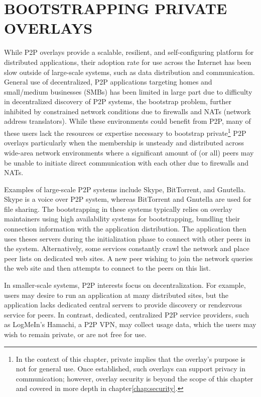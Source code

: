 \chapter{BOOTSTRAPPING PRIVATE OVERLAYS}
\label{chap:bootstrapping}

While P2P overlays provide a scalable, resilient, and self-configuring platform
for distributed applications, their adoption rate for use across the Internet
has been slow outside of large-scale systems, such as data distribution and
communication.  General use of decentralized, P2P applications targeting homes
and small/medium businesses (SMBs) has been limited in large part due to
difficulty in decentralized discovery of P2P systems, the bootstrap problem,
further inhibited by constrained network conditions due to firewalls and NATs
(network address translators).  While these environments could benefit from
P2P, many of these users lack the resources or expertise necessary to bootstrap
private\footnote{In the context of this chapter, private implies that the
overlay's purpose is not for general use. Once established, such overlays can
support privacy in communication; however, overlay security is beyond the scope
of this chapter and covered in more depth in chapter\ref{chap:security}.} P2P
overlays particularly when the membership is unsteady and distributed across
wide-area network environments where a significant amount of (or all) peers may
be unable to initiate direct communication with each other due to firewalls and
NATs.

Examples of large-scale P2P systems include Skype, BitTorrent, and Gnutella.
Skype is a voice over P2P system, whereas BitTorrent and Gnutella are used for
file sharing.  The bootstrapping in these systems typically relies on overlay
maintainers using high availability systems for bootstrapping, bundling their
connection information with the application distribution.  The application then
uses theses servers during the initialization phase to connect with other peers
in the system.  Alternatively, some services constantly crawl the network and
place peer lists on dedicated web sites. A new peer wishing to join the network
queries the web site and then attempts to connect to the peers on this list.

In smaller-scale systems, P2P interests focus on decentralization.  For
example, users may desire to run an application at many distributed sites, but
the application lacks dedicated central servers to provide discovery or
rendezvous service for peers.  In contrast, dedicated, centralized P2P service
providers, such as LogMeIn's Hamachi, a P2P VPN, may collect usage data, which
the users may wish to remain private, or are not free for use.

